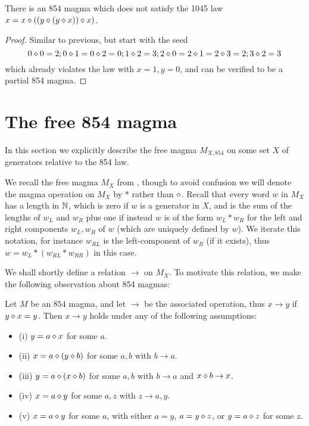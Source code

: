 \begin{corollary}\leanok{}\label{854-1045}  There is an 854 magma which does not satisfy the 1045 law $x = x \diamond ((y \diamond (y \diamond x)) \diamond x)$.
\end{corollary}

\begin{proof} Similar to previous, but start with the seed
$$ 0 \diamond 0 = 2; 0 \diamond 1 = 0 \diamond 2 = 0; 1 \diamond 2 = 3; 2 \diamond 0 = 2 \diamond 1 = 2 \diamond 3 = 2; 3 \diamond 2 = 3$$
which already violates the law with $x=1,y=0$, and can be verified to be a partial 854 magma.
\end{proof}

\section{The free 854 magma}

In this section we explicitly describe the free magma $M_{X, 854}$ on some set $X$ of generators relative to the 854 law.

We recall the free magma $M_X$ from , though to avoid confusion we will denote the magma operation on $M_X$ by $*$ rather than $\diamond$.  Recall that every word $w$ in $M_X$ has a length in $\mathbb{N}$, which is zero if $w$ is a generator in $X$, and is the sum of the lengths of $w_L$ and $w_R$ plus one if instead $w$ is of the form $w_L * w_R$ for the left and right components $w_L, w_R$ of $w$ (which are uniquely defined by $w$).  We iterate this notation, for instance $w_{RL}$ is the left-component of $w_R$ (if it exists), thus $w = w_L * (w_{RL} * w_{RR})$ in this case.

We shall shortly define a relation $\to$ on $M_X$.  To motivate this relation, we make the following observation about 854 magmas:

\begin{lemma}\label{854-relation}  Let $M$ be an $854$ magma, and let $\to$ be the associated operation, thus $x \to y$ if $y \diamond x = y$.  Then $x \to y$ holds under any of the following assumptions:
  \begin{itemize}
  \item (i) $y = a \diamond x$ for some $a$.
  \item (ii) $x = a \diamond (y \diamond b)$ for some $a,b$ with $b \to a$.
  \item (iii) $y = a \diamond (x \diamond b)$ for some $a,b$ with $b \to a$ and $x \diamond b \to x$.
  \item (iv) $x = a \diamond y$ for some $a,z$ with $z \to a, y$.
  \item (v) $x = a \diamond y$ for some $a$, with either $a=y$, $a = y \diamond z$, or $y = a \diamond z$ for some $z$.
  \end{itemize}
\end{lemma}

